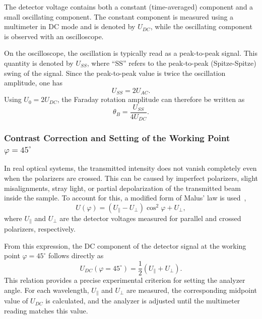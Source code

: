 \documentclass[a4paper]{article}
\begin{document}
The detector voltage contains both a constant (time-averaged) component and a small oscillating component.
The constant component is measured using a multimeter in DC mode and is denoted by $U_{DC}$, while the oscillating component is observed with an oscilloscope.

On the oscilloscope, the oscillation is typically read as a peak-to-peak signal.
This quantity is denoted by $U_{SS}$, where ``SS'' refers to the peak-to-peak (Spitze-Spitze) swing of the signal.
Since the peak-to-peak value is twice the oscillation amplitude, one has
\[
  U_{SS} = 2 U_{AC}.
\]
Using $U_0 = 2 U_{DC}$, the Faraday rotation amplitude can therefore be written as
\begin{equation}
  \theta_B = \frac{U_{SS}}{4 U_{DC}}.
  \label{eq:rotation_from_signal}
\end{equation}

\subsubsection{Contrast Correction and Setting of the Working Point \texorpdfstring{$\varphi=45^\circ$}{}}
\label{sec:contrast_correction}

In real optical systems, the transmitted intensity does not vanish completely even when the polarizers are crossed.
This can be caused by imperfect polarizers, slight misalignments, stray light, or partial depolarization of the transmitted beam inside the sample.
To account for this, a modified form of Malus' law is used~\cite{FARAnleitung},
\begin{equation}
  U(\varphi) = (U_{\parallel} - U_{\perp}) \cos^2 \varphi + U_{\perp},
  \label{eq:malus_modified}
\end{equation}
where $U_{\parallel}$ and $U_{\perp}$ are the detector voltages measured for parallel and crossed polarizers, respectively.

From this expression, the DC component of the detector signal at the working point $\varphi = 45^\circ$ follows directly as
\begin{equation}
  U_{DC}(\varphi = 45^\circ) = \frac{1}{2}\left(U_{\parallel} + U_{\perp}\right).
  \label{eq:UDC_workingpoint}
\end{equation}
This relation provides a precise experimental criterion for setting the analyzer angle.
For each wavelength, $U_{\parallel}$ and $U_{\perp}$ are measured, the corresponding midpoint value of $U_{DC}$ is calculated, and the analyzer is adjusted until the multimeter reading matches this value.
\end{document}
